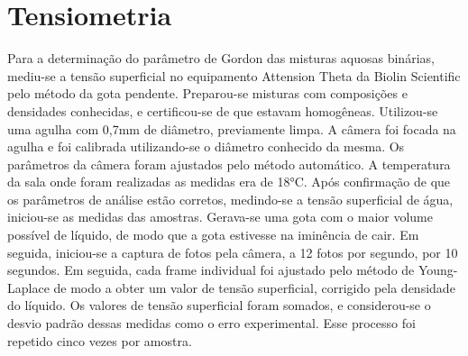 		\section{Tensiometria}
		
		Para a determinação do parâmetro de Gordon das misturas aquosas binárias, mediu-se a tensão superficial no equipamento Attension Theta da Biolin Scientific pelo método da gota pendente. Preparou-se misturas com composições e densidades conhecidas, e certificou-se de que estavam homogêneas. Utilizou-se uma agulha com 0,7mm de diâmetro, previamente limpa. A câmera foi focada na agulha e foi calibrada utilizando-se o diâmetro conhecido da mesma. Os parâmetros da câmera foram ajustados pelo método automático. A temperatura da sala onde foram realizadas as medidas era de 18°C. Após confirmação de que os parâmetros de análise estão corretos, medindo-se a tensão superficial de água, iniciou-se as medidas das amostras. Gerava-se uma gota com o maior volume possível de líquido, de modo que a gota estivesse na iminência de cair. Em seguida, iniciou-se a captura de fotos pela câmera, a 12 fotos por segundo, por 10 segundos. Em seguida, cada frame individual foi ajustado pelo método de Young-Laplace de modo a obter um valor de tensão superficial, corrigido pela densidade do líquido. Os valores de tensão superficial foram somados, e considerou-se o desvio padrão dessas medidas como o erro experimental. Esse processo foi repetido cinco vezes por amostra.